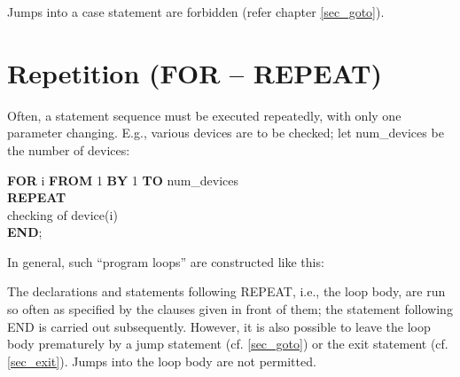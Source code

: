 Jumps into a case statement are forbidden (refer chapter \ref{sec_goto}).

\section{Repetition (FOR -- REPEAT)}   %
\label{sec_repetition}

Often, a statement sequence must be executed repeatedly, with only one
parameter changing. E.g., various devices are to be checked; let
num\_devices be the number of devices:

{\bf FOR} i {\bf FROM} 1 {\bf BY} 1 {\bf TO} num\_devices\\
{\bf REPEAT}\\
\x checking of device(i)\\
{\bf END};

In general, such ``program loops'' are constructed like this:



The declarations and statements following REPEAT, i.e., the loop body,
are run so often as specified by the clauses given in front of them; the
statement following END is carried out subsequently. However, it is also
possible to leave the loop body prematurely by a jump statement (cf. \ref{sec_goto})
or the exit statement (cf. \ref{sec_exit}). Jumps into the loop body are not permitted.

